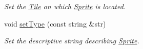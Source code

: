 \begin{DoxyCompactItemize}
\begin{DoxyCompactList}\small\item\em Set the \hyperlink{class_tile}{Tile} on which \hyperlink{class_sprite}{Sprite} is located. \end{DoxyCompactList}\item 
void \hyperlink{class_sprite_a0c2efc62131a56a1c81405527a930b71}{set\+Type} (const string \&str)\hypertarget{class_sprite_a0c2efc62131a56a1c81405527a930b71}{}\label{class_sprite_a0c2efc62131a56a1c81405527a930b71}

\begin{DoxyCompactList}\small\item\em Set the descriptive string describing \hyperlink{class_sprite}{Sprite}. \end{DoxyCompactList}\end{DoxyCompactItemize}

